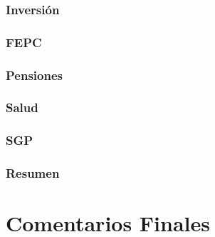 \documentclass[aspectratio=169,10pt]{beamer}
\begin{document}
\subsubsection{Inversión}

\subsubsection{FEPC}

\subsubsection{Pensiones}
\subsubsection{Salud}


\subsubsection{SGP}



\subsubsection{Resumen}

\section{Comentarios Finales}


























\end{document}
